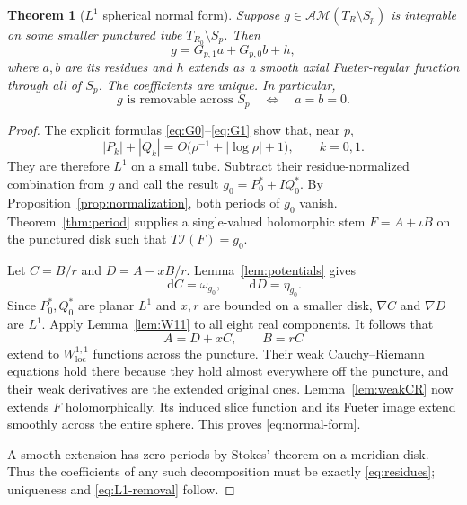 \documentclass[11pt,a4paper]{article}
\numberwithin{equation}{section}
\newtheorem{theorem}{Theorem}[section]
\theoremstyle{definition}
\theoremstyle{remark}
\newcommand{\ic}{\iota}
\newcommand{\AM}{\mathcal{AM}}
\newcommand{\dd}{\,\mathrm d}
\newcommand{\cI}{\mathcal I}
\begin{document}
\begin{theorem}[$L^1$ spherical normal form]\label{thm:L1}
Suppose $g\in\AM(T_R\setminus S_p)$ is integrable on some smaller punctured
tube $T_{R_0}\setminus S_p$. Then
\begin{equation}
 g=G_{p,1}a+G_{p,0}b+h,
 \label{eq:normal-form}
\end{equation}
where $a,b$ are its residues and $h$ extends as a smooth axial
Fueter-regular function through all of $S_p$.
The coefficients are unique. In particular,
\begin{equation}
 g\text{ is removable across }S_p
 \quad\Longleftrightarrow\quad a=b=0.
 \label{eq:L1-removal}
\end{equation}
\end{theorem}
\begin{proof}
The explicit formulas \eqref{eq:G0}--\eqref{eq:G1} show that, near $p$,
\[
 |P_k|+|Q_k|=O\bigl(\rho^{-1}+|\log\rho|+1\bigr),\qquad k=0,1.
\]
They are therefore $L^1$ on a small tube. Subtract their residue-normalized
combination from $g$ and call the result $g_0=P_0^*+I Q_0^*$. By
Proposition~\ref{prop:normalization}, both periods of $g_0$ vanish.
Theorem~\ref{thm:period} supplies a single-valued holomorphic stem
$F=A+\ic B$ on the punctured disk such that $T\cI(F)=g_0$.

Let $C=B/r$ and $D=A-xB/r$. Lemma~\ref{lem:potentials} gives
\[
 \dd C=\omega_{g_0},\qquad \dd D=\eta_{g_0}.
\]
Since $P_0^*,Q_0^*$ are planar $L^1$ and $x,r$ are bounded on a smaller disk,
$\nabla C$ and $\nabla D$ are $L^1$. Apply Lemma~\ref{lem:W11} to all eight
real components. It follows that
\[
 A=D+xC,\qquad B=rC
\]
extend to $W^{1,1}_{\mathrm{loc}}$ functions across the puncture. Their weak
Cauchy--Riemann equations hold there because they hold almost everywhere off
the puncture, and their weak derivatives are the extended original ones.
Lemma~\ref{lem:weakCR} now extends $F$ holomorphically. Its induced slice
function and its Fueter image extend smoothly across the entire sphere.
This proves \eqref{eq:normal-form}.

A smooth extension has zero periods by Stokes' theorem on a meridian disk.
Thus the coefficients of any such decomposition must be exactly
\eqref{eq:residues}; uniqueness and \eqref{eq:L1-removal} follow.
\end{proof}
\end{document}
